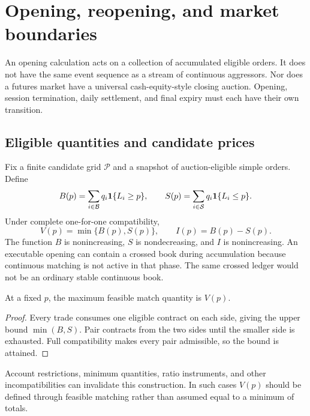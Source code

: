 \section{Opening, reopening, and market boundaries}
\label{sec:opening}

An opening calculation acts on a collection of accumulated eligible orders. It does not have the same event sequence as a stream of continuous aggressors. Nor does a futures market have a universal cash-equity-style closing auction. Opening, session termination, daily settlement, and final expiry must each have their own transition.

\subsection{Eligible quantities and candidate prices}

Fix a finite candidate grid $\mathcal P$ and a snapshot of auction-eligible simple orders. Define
\begin{equation}
 B(p)=\sum_{i\in\mathcal B}q_i\mathbf 1\{L_i\ge p\},\qquad
 S(p)=\sum_{i\in\mathcal S}q_i\mathbf 1\{L_i\le p\}.
\end{equation}
Under complete one-for-one compatibility,
\begin{equation}
 V(p)=\min\{B(p),S(p)\},\qquad I(p)=B(p)-S(p).
\label{eq:auction}
\end{equation}
The function $B$ is nonincreasing, $S$ is nondecreasing, and $I$ is nonincreasing. An executable opening can contain a crossed book during accumulation because continuous matching is not active in that phase. The same crossed ledger would not be an ordinary stable continuous book.

\begin{proposition}
At a fixed $p$, the maximum feasible match quantity is $V(p)$.
\end{proposition}
\begin{proof}
Every trade consumes one eligible contract on each side, giving the upper bound $\min(B,S)$. Pair contracts from the two sides until the smaller side is exhausted. Full compatibility makes every pair admissible, so the bound is attained.
\end{proof}

Account restrictions, minimum quantities, ratio instruments, and other incompatibilities can invalidate this construction. In such cases $V(p)$ should be defined through feasible matching rather than assumed equal to a minimum of totals.

